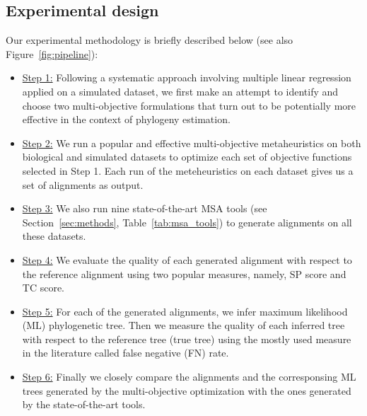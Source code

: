 \subsection{Experimental design}
Our experimental methodology is briefly described below (see also Figure~\ref{fig:pipeline}):
\begin{itemize}
	\item \underline{Step 1:} Following a systematic approach involving multiple linear regression applied on a simulated dataset, we first make an attempt to identify and choose two multi-objective formulations that turn out to be potentially more effective in the context of phylogeny estimation. 
	\item \underline{Step 2:} We run a popular and effective multi-objective metaheuristics on both biological and simulated datasets to optimize each set of objective functions selected in Step 1. Each run of the meteheuristics on each dataset gives us a set of alignments as output. 
	\item \underline{Step 3:} We also run nine state-of-the-art MSA tools (see Section~\ref{sec:methods}, Table~\ref{tab:msa_tools})  to generate alignments on all these datasets.
	\item \underline{Step 4:} We evaluate the quality of each generated alignment with respect to the reference alignment using two popular measures, namely, SP score and TC score. 
	\item \underline{Step 5:} For each of the generated alignments, we infer maximum likelihood (ML) phylogenetic tree. Then we measure the quality of each inferred tree with respect to the reference tree (true tree) using the mostly used measure in the literature called false negative (FN) rate.
	\item \underline{Step 6:} Finally we closely compare the alignments and the corresponsing ML trees generated by the multi-objective optimization with the ones generated by the state-of-the-art tools. %
\end{itemize}


